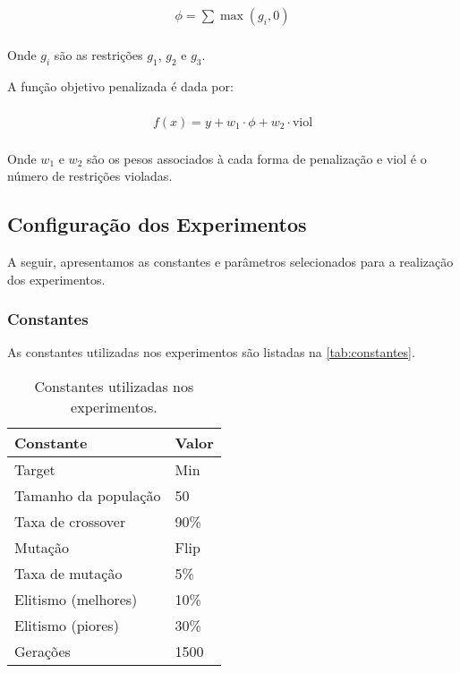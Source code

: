 \begin{gather}
    \begin{align}
        \begin{split}
            \phi = \sum \max(g_i, 0)
        \end{split}
    \end{align}
\end{gather}

Onde \(g_i\) são as restrições \(g_1\), \(g_2\) e \(g_3\).


A função objetivo penalizada é dada por:

\begin{gather}
    \begin{align}
        \begin{split}
            f(x) = y + w_1 \cdot \phi + w_2 \cdot \text{viol}
        \end{split}
    \end{align}
\end{gather}

Onde \(w_1\) e \(w_2\) são os pesos associados à cada forma de penalização e \(\text{viol}\) é o número de restrições violadas.

\subsection{Configuração dos Experimentos}

A seguir, apresentamos as constantes e parâmetros selecionados para a realização dos experimentos.

\subsubsection{Constantes}

As constantes utilizadas nos experimentos são listadas na \autoref{tab:constantes}.

\begin{table}[htb]
    \center%
    \begin{tabular}{l l}
        \bottomrule
        \textbf{Constante}    & \textbf{Valor} \\ \midrule
        Target               & Min            \\ \midrule
        Tamanho da população & 50             \\ \midrule
        Taxa de crossover    & 90\%           \\ \midrule
        Mutação              & Flip           \\ \midrule
        Taxa de mutação      & 5\%            \\ \midrule
        Elitismo (melhores)  & 10\%           \\ \midrule
        Elitismo (piores)    & 30\%           \\ \midrule
        Gerações             & 1500           \\ \toprule
    \end{tabular}
    \caption{Constantes utilizadas nos experimentos.}%
    \label{tab:constantes}
\end{table}

